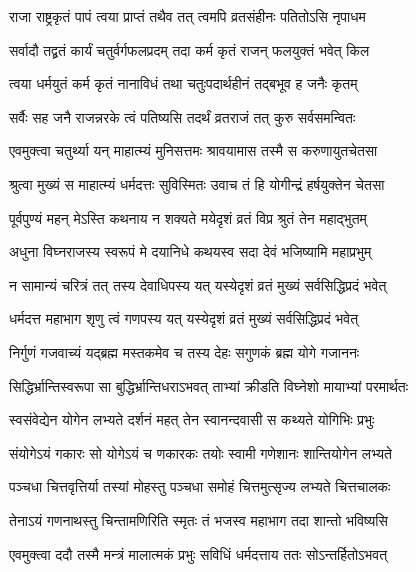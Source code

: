 \twolineshloka
{राजा राष्ट्रकृतं पापं त्वया प्राप्तं तथैव तत्}
{त्वमपि व्रतसंहीनः पतितोऽसि नृपाधम} %

\twolineshloka
{सर्वादौ तद्व्रतं कार्यं चतुर्वर्गफलप्रदम्}
{तदा कर्म कृतं राजन् फलयुक्तं भवेत् किल} %

\twolineshloka
{त्वया धर्मयुतं कर्म कृतं नानाविधं तथा}
{चतुःपदार्थहीनं तद्बभूव ह जनैः कृतम्} %

\twolineshloka
{सर्वैः सह जनै राजन्नरके त्वं पतिष्यसि}
{तदर्थं व्रतराजं तत् कुरु सर्वसमन्वितः} %

\twolineshloka
{एवमुक्त्वा चतुर्थ्या यन् माहात्म्यं मुनिसत्तमः}
{श्रावयामास तस्मै स करुणायुतचेतसा} %

\twolineshloka
{श्रुत्वा मुख्यं स माहात्म्यं धर्मदत्तः सुविस्मितः}
{उवाच तं हि योगीन्द्रं हर्षयुक्तेन चेतसा} %


\twolineshloka
{पूर्वपुण्यं महन् मेऽस्ति कथनाय न शक्यते}
{मयेदृशं व्रतं विप्र श्रुतं तेन महाद्भुतम्} %

\twolineshloka
{अधुना विघ्नराजस्य स्वरूपं मे दयानिधे}
{कथयस्व सदा देवं भजिष्यामि महाप्रभुम्} %

\twolineshloka
{न सामान्यं चरित्रं तत् तस्य देवाधिपस्य यत्}
{यस्येदृशं व्रतं मुख्यं सर्वसिद्धिप्रदं भवेत्} %


\twolineshloka
{धर्मदत्त महाभाग श‍ृणु त्वं गणपस्य यत्}
{यस्येदृशं व्रतं मुख्यं सर्वसिद्धिप्रदं भवेत्} %

\twolineshloka
{निर्गुणं गजवाच्यं यद्ब्रह्म मस्तकमेव च}
{तस्य देहः सगुणकं ब्रह्म योगे गजाननः} %

\twolineshloka
{सिद्धिर्भ्रान्तिस्वरूपा सा बुद्धिर्भ्रान्तिधराऽभवत्}
{ताभ्यां क्रीडति विघ्नेशो मायाभ्यां परमार्थतः} %

\twolineshloka
{स्वसंवेद्येन योगेन लभ्यते दर्शनं महत्}
{तेन स्वानन्दवासी स कथ्यते योगिभिः प्रभुः} %

\twolineshloka
{संयोगेऽयं गकारः सो योगेऽयं च णकारकः}
{तयोः स्वामी गणेशानः शान्तियोगेन लभ्यते} %

\twolineshloka
{पञ्चधा चित्तवृत्तिर्या तस्यां मोहस्तु पञ्चधा}
{समोहं चित्तमुत्सृज्य लभ्यते चित्तचालकः} %

\twolineshloka
{तेनाऽयं गणनाथस्तु चिन्तामणिरिति स्मृतः}
{तं भजस्व महाभाग तदा शान्तो भविष्यसि} %

\twolineshloka
{एवमुक्त्वा ददौ तस्मै मन्त्रं मालात्मकं प्रभुः}
{सविधिं धर्मदत्ताय ततः सोऽन्तर्हितोऽभवत्} %


